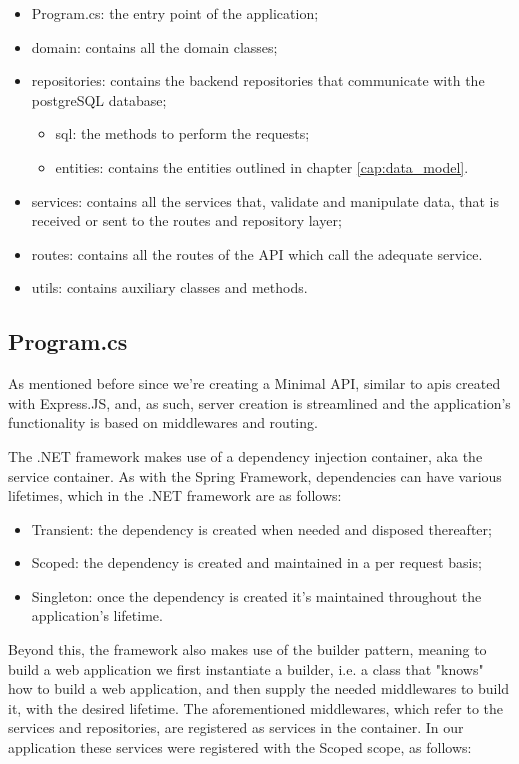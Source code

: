 \begin{itemize}
 \item Program.cs: the entry point of the application;
 \item domain: contains all the domain classes;
 \item repositories: contains the backend repositories that communicate with the postgreSQL database;
 \begin{itemize}
 	\item sql: the methods to perform the requests;
 	\item entities: contains the entities outlined in chapter \ref{cap:data_model}.
 \end{itemize}
 \item services: contains all the services that, validate and manipulate data, that is received or sent to the routes and repository layer;
 \item routes: contains all the routes of the API which call the adequate service.
 \item utils: contains auxiliary classes and methods.
\end{itemize}

\subsection{Program.cs}

As mentioned before since we're creating a Minimal API, similar to apis created with Express.JS, and, as such, server creation is streamlined and the application's functionality is based on middlewares and routing.

The .NET framework makes use of a dependency injection container, aka the service container. As with the Spring Framework, dependencies can have various lifetimes, which in the .NET framework are as follows:
\begin{itemize}
	\item Transient: the dependency is created when needed and disposed thereafter;
	\item Scoped: the dependency is created and maintained in a per request basis;
	\item Singleton: once the dependency is created it's maintained throughout the application's lifetime. 
\end{itemize}
Beyond this, the framework also makes use of the builder pattern, meaning to build a web application we first instantiate a builder, i.e. a class that "knows" how to build a web application, and then supply the needed middlewares to build it, with the desired lifetime.
The aforementioned middlewares, which refer to the services and repositories, are registered as services in the container. In our application these services were registered with the Scoped scope, as follows:

